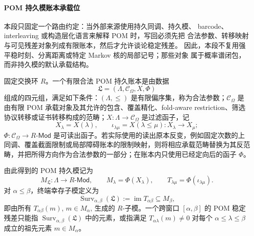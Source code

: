 \paragraph{POM 持久模账本承载位}\label{para:pom-persistence-module-ledger}
本段只固定一个路由约定：当外部来源使用持久同调、持久模、
barcode、interleaving 或构造层化语言来解释 POM 时，写回必须先把
合法参数、转移映射与可见残差对象列成有限账本，然后才允许谈论稳定残差。
因此，本段不复用强平稳时刻、分离距离或特定 Markov 核的局部记号；那些对象
属于概率谱闭包，而非持久模的默认承载结构。
\begin{definition}\label{distill:persistent_homology_persistence_modules_and_constructible_sheaf_persistence-functorial_persistence_construction-finite-legal-pom-persistence-ledger}
固定交换环 \(R\)。一个有限合法 POM 持久账本是由数据
\[
   \mathfrak L=(\Lambda,\mathcal C_\Omega,X,\Phi)
\]
组成的四元组，满足如下条件：\((\Lambda,\leq)\) 是有限偏序集，称为合法参数；\(\mathcal C_\Omega\) 是由有限 POM 承载对象及其允许的包含、覆盖精化、fold-aware restriction、筛选协议转移或证书转移构成的范畴；\(X:\Lambda\to\mathcal C_\Omega\) 是过滤函子，记
\[
   X_\lambda=X(\lambda),\qquad
   \iota_{\lambda\mu}=X(\lambda\leq \mu):X_\lambda\longrightarrow X_\mu ;
\]
\(\Phi:\mathcal C_\Omega\to R\text{-}\mathsf{Mod}\) 是可读出函子。若实际使用的读出原本反变，例如固定次数的上同调、覆盖截面限制或局部障碍账本的限制映射，则将相应承载范畴替换为其反范畴，并把所得方向作为合法参数的一部分；在账本内只使用已经定向后的函子 \(\Phi\)。

由此得到的 POM 持久模记为
\[
   M_{\mathfrak L}:\Lambda\longrightarrow R\text{-}\mathsf{Mod},\qquad
   M_\lambda=\Phi(X_\lambda),\qquad
   T_{\lambda\mu}=\Phi(\iota_{\lambda\mu}) .
\]
对 \(\alpha\leq\beta\)，终端幸存子模定义为
\[
   \operatorname{Surv}_{\alpha,\beta}(\mathfrak L)
   :=\operatorname{im}T_{\alpha\beta}\subseteq M_\beta,
\]
即由所有 \(T_{\alpha\beta}(m)\), \(m\in M_\alpha\), 生成的 \(R\)-子模。一个跨窗口 \([\alpha,\beta]\) 的 POM 稳定残差只能指 \(\operatorname{Surv}_{\alpha,\beta}(\mathfrak L)\) 中的元素，或指满足 \(T_{\alpha\lambda}(m)\neq 0\) 对每个 \(\alpha\leq\lambda\leq\beta\) 成立的祖先元素 \(m\in M_\alpha\)。
\end{definition}
